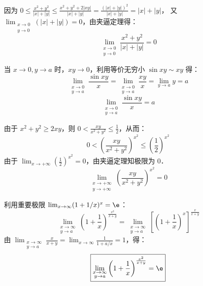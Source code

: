 \begin{solution}
    因为 $0 \le \frac{x^2 + y^2}{|x| + |y|} \le \frac{x^2 + y^2 + 2|xy|}{|x| + |y|} = \frac{(|x| + |y|)^2}{|x| + |y|} = |x| + |y|$，
    又 $\lim_{\substack{x \to 0 \\ y \to 0}} (|x| + |y|) = 0$，由夹逼定理得：
    \begin{equation}
        \boxed{\lim_{\substack{x \to 0 \\ y \to 0}} \frac{x^2 + y^2}{|x| + |y|} = 0}
    \end{equation}

    当 $x \to 0, y \to a$ 时，$xy \to 0$，利用等价无穷小 $\sin xy \sim xy$ 得：
    \begin{equation}
        \lim_{\substack{x \to 0 \\ y \to a}} \frac{\sin xy}{x} = \lim_{\substack{x \to 0 \\ y \to a}} \frac{xy}{x} = \lim_{y \to a} y = a
    \end{equation}
    \begin{equation}
        \boxed{\lim_{\substack{x \to 0 \\ y \to a}} \frac{\sin xy}{x} = a}
    \end{equation}

    由于 $x^2 + y^2 \ge 2xy$，则 $0 < \frac{xy}{x^2 + y^2} \le \frac{1}{2}$，从而：
    \begin{equation}
        0 < \left( \frac{xy}{x^2 + y^2} \right)^{x^2} \le \left( \frac{1}{2} \right)^{x^2}
    \end{equation}
    由于 $\lim_{x \to +\infty} \left( \frac{1}{2} \right)^{x^2} = 0$，由夹逼定理知极限为 $0$．
    \begin{equation}
        \boxed{\lim_{\substack{x \to +\infty \\ y \to +\infty}} \left( \frac{xy}{x^2 + y^2} \right)^{x^2} = 0}
    \end{equation}

    利用重要极限 $\lim_{x \to \infty} (1 + 1/x)^x = \e$：
    \begin{equation}
        \lim_{\substack{x \to \infty \\ y \to a}} \left( 1 + \frac{1}{x} \right)^{\frac{x^2}{x+y}} = \lim_{\substack{x \to \infty \\ y \to a}} \left[ \left( 1 + \frac{1}{x} \right)^x \right]^{\frac{x}{x+y}}
    \end{equation}
    由 $\lim_{\substack{x \to \infty \\ y \to a}} \frac{x}{x+y} = \lim_{x \to \infty} \frac{1}{1 + a/x} = 1$，得：
    \begin{equation}
        \boxed{\lim_{\substack{x \to \infty \\ y \to a}} \left( 1 + \frac{1}{x} \right)^{\frac{x^2}{x+y}} = \e}
    \end{equation}


\end{solution}
